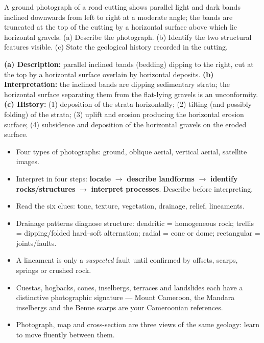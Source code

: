 \documentclass[11pt]{article}
\newcommand{\cle}[1]{{\popxbold\color{popdark}#1}}
\begin{document}
\begin{exercice}
A ground photograph of a road cutting shows parallel light and dark bands inclined downwards from left to right at a moderate angle; the bands are truncated at the top of the cutting by a horizontal surface above which lie horizontal gravels. (a) Describe the photograph. (b) Identify the two structural features visible. (c) State the geological history recorded in the cutting.
\end{exercice}

\begin{corrige}[Exercise 2]
\textbf{(a) Description:} parallel inclined bands (bedding) dipping to the right, cut at the top by a horizontal surface overlain by horizontal deposits.
\textbf{(b) Interpretation:} the inclined bands are \cle{dipping sedimentary strata}; the horizontal surface separating them from the flat-lying gravels is an \cle{unconformity}.
\textbf{(c) History:} (1) deposition of the strata horizontally; (2) tilting (and possibly folding) of the strata; (3) uplift and erosion producing the horizontal erosion surface; (4) subsidence and deposition of the horizontal gravels on the eroded surface.
\end{corrige}

\begin{aretenir}
\begin{itemize}
\item Four types of photographs: ground, oblique aerial, vertical aerial, satellite images.
\item Interpret in four steps: \textbf{locate} $\rightarrow$ \textbf{describe landforms} $\rightarrow$ \textbf{identify rocks/structures} $\rightarrow$ \textbf{interpret processes}. Describe before interpreting.
\item Read the six clues: tone, texture, vegetation, drainage, relief, lineaments.
\item Drainage patterns diagnose structure: dendritic = homogeneous rock; trellis = dipping/folded hard--soft alternation; radial = cone or dome; rectangular = joints/faults.
\item A lineament is only a \emph{suspected} fault until confirmed by offsets, scarps, springs or crushed rock.
\item Cuestas, hogbacks, cones, inselbergs, terraces and landslides each have a distinctive photographic signature — Mount Cameroon, the Mandara inselbergs and the Benue scarps are your Cameroonian references.
\item Photograph, map and cross-section are three views of the same geology: learn to move fluently between them.
\end{itemize}
\end{aretenir}
\end{document}
